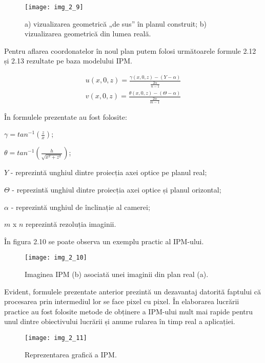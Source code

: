 \begin{figure}[!h]
	\centering
	\texttt{[image: img\_2\_9]}
	\caption{a) vizualizarea geometrică „de sus” în planul construit; b) vizualizarea geometrică din lumea reală.}
	\label{fig:nonfloat}
\end{figure}

Pentru aflarea coordonatelor în noul plan putem folosi următoarele formule 2.12 și 2.13 rezultate pe baza modelului IPM.

\begin{align}	
	u(x,0,z) = \frac{\gamma(x,0,z) - (Y-\alpha)}{\frac{2\alpha}{n-1}}
\end{align}
\begin{align}	
	v(x,0,z) = \frac{\theta(x,0,z) - (\Theta - \alpha)}{\frac{2\alpha}{m-1}}
\end{align}

În formulele prezentate au fost folosite:

$\gamma = tan^{-1}(\frac{z}{x})$;

$\theta = tan^{-1}(\frac{h}{\sqrt{x^2+z^2}})$;

$Y$ - reprezintă unghiul dintre proiecția axei optice pe planul real; 

$\Theta$ - reprezintă unghiul dintre proiecția axei optice și planul orizontal;
 
$\alpha$ - reprezintă unghiul de înclinație al camerei;

$m$ x $n$ reprezintă rezoluția imaginii.

În figura 2.10 se poate observa un exemplu practic al IPM-ului.

\begin{figure}[!h]
	\centering
	\texttt{[image: img\_2\_10]}
	\caption{Imaginea IPM (b) asociată unei imaginii din plan real (a).}
	\label{fig:nonfloat}
\end{figure}

Evident, formulele prezentate anterior prezintă un dezavantaj datorită faptului că procesarea prin intermediul lor se face pixel cu pixel. În elaborarea lucrării practice au fost folosite metode de obținere a IPM-ului mult mai rapide pentru unul dintre obiectivului lucrării și anume rularea în timp real a aplicației.

\begin{figure}[!h]
	\centering
	\texttt{[image: img\_2\_11]}
	\caption{Reprezentarea grafică a IPM.}
	\label{fig:nonfloat}
\end{figure}